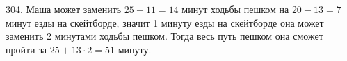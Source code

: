 304. Маша может заменить $25-11=14$ минут ходьбы пешком на $20-13=7$ минут езды на скейтборде, значит 1 минуту езды на скейтборде она может заменить 2 минутами ходьбы пешком. Тогда весь путь пешком она сможет пройти за $25+13\cdot2=51$ минуту.\\
